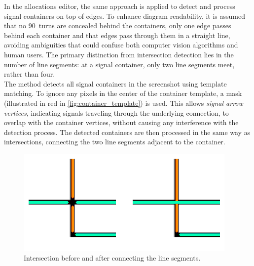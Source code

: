 In the allocations editor, the same approach is applied to detect and process signal containers on top of edges. To enhance diagram readability, it is assumed that no 90\textdegree\ turns are concealed behind the containers, only one edge passes behind each container and that edges pass through them in a straight line, avoiding ambiguities that could confuse both computer vision algorithms and human users. The primary distinction from intersection detection lies in the number of line segments: at a signal container, only two line segments meet, rather than four.\\
The method detects all signal containers in the screenshot using template matching. To ignore any pixels in the center of the container template, a mask (illustrated in red in \autoref{fig:container_template}) is used. This allows \textit{signal arrow vertices}, indicating signals traveling through the underlying connection, to overlap with the container vertices, without causing any interference with the detection process. The detected containers are then processed in the same way as intersections, connecting the two line segments adjacent to the container.
\begin{figure}[ht]
    \centering
    \includegraphics[width=0.7\linewidth]{pictures/intersection_before_after.png}
    \caption[Intersection before and after connecting line segments]{Intersection before and after connecting the line segments.}
    \label{fig:intersection_before_after}
\end{figure}
\newpage
